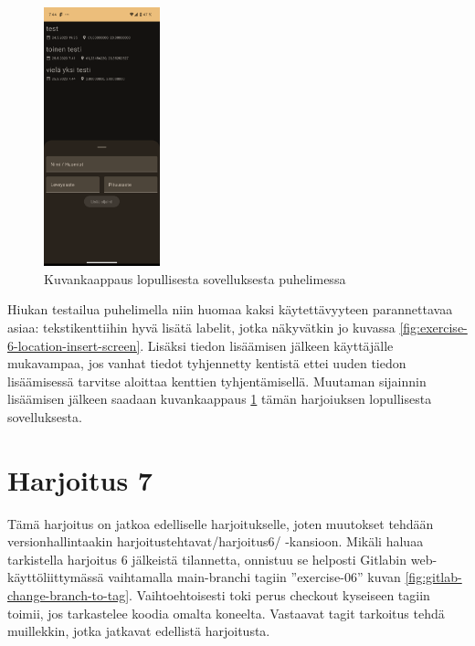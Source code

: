 \begin{figure}
    \includegraphics[width=0.3\textwidth]{figures/exercise-6-final.png}
    \caption{Kuvankaappaus lopullisesta sovelluksesta puhelimessa}
    \label{fig:exercise-6-final}
\end{figure}

Hiukan testailua puhelimella niin huomaa kaksi käytettävyyteen parannettavaa
asiaa: tekstikenttiihin hyvä lisätä labelit, jotka näkyvätkin jo kuvassa
\ref{fig:exercise-6-location-insert-screen}. Lisäksi tiedon lisäämisen jälkeen
käyttäjälle mukavampaa, jos vanhat tiedot tyhjennetty kentistä ettei uuden
tiedon lisäämisessä tarvitse aloittaa kenttien tyhjentämisellä. Muutaman
sijainnin lisäämisen jälkeen saadaan kuvankaappaus \ref{fig:exercise-6-final}
tämän harjoiuksen lopullisesta sovelluksesta.

\section{Harjoitus 7}

Tämä harjoitus on jatkoa edelliselle harjoitukselle, joten muutokset tehdään
versionhallintaakin harjoitustehtavat/harjoitus6/ -kansioon. Mikäli haluaa
tarkistella harjoitus 6 jälkeistä tilannetta, onnistuu se helposti Gitlabin
web-käyttöliittymässä vaihtamalla main-branchi tagiin ''exercise-06'' kuvan
\ref{fig:gitlab-change-branch-to-tag}. Vaihtoehtoisesti toki perus checkout
kyseiseen tagiin toimii, jos tarkastelee koodia omalta koneelta. Vastaavat
tagit tarkoitus tehdä muillekkin, jotka jatkavat edellistä harjoitusta.

